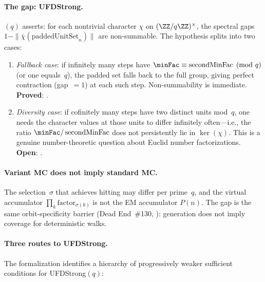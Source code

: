 \paragraph{The gap: UFDStrong.}
$(q)$ asserts: for each nontrivial character
$\chi$ on $(\ZZ/q\ZZ)^\times$, the spectral gaps
$1 - \|\bar\chi(\text{paddedUnitSet}_n)\|$ are non-summable.
The hypothesis splits into two cases:
\begin{enumerate}[nosep]
\item \emph{Fallback case}: if infinitely many steps have
  $\minFac \equiv \operatorname{secondMinFac} \pmod{q}$ (or one
  equals~$q$), the padded set falls back to the full group, giving
  perfect contraction (gap~$= 1$) at each such step.
  Non-summability is immediate.
  \textbf{Proved}:
  .
\item \emph{Diversity case}: if cofinitely many steps have two
  distinct units mod~$q$, one needs the character values at those
  units to differ infinitely often---i.e., the ratio
  $\minFac/\operatorname{secondMinFac}$ does not persistently lie in
  $\ker(\chi)$.  This is a genuine number-theoretic question about
  Euclid number factorizations.  \textbf{Open}:
  .
\end{enumerate}

\paragraph{Variant MC does not imply standard MC.}
The selection~$\sigma$ that achieves hitting may differ per
prime~$q$, and the virtual accumulator
$\prod_k \text{factor}_{\sigma(k)}$ is not the EM accumulator
$P(n)$.  The gap is the same orbit-specificity barrier
(Dead End~\#130,
):
generation does not imply coverage for deterministic walks.

\paragraph{Three routes to UFDStrong.}
The formalization identifies a hierarchy of progressively weaker
sufficient conditions for UFDStrong$(q)$:

